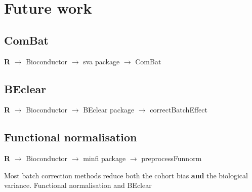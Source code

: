\documentclass[a4paper,10pt]{article}
\begin{document}
\section{Future work}
\subsection{ComBat}
%
\textbf{R} $\rightarrow$ Bioconductor $\rightarrow$ sva package $\rightarrow$ ComBat

\subsection{BEclear}

\textbf{R} $\rightarrow$ Bioconductor $\rightarrow$ BEclear package $\rightarrow$ correctBatchEffect

\subsection{Functional normalisation}

\textbf{R} $\rightarrow$ Bioconductor $\rightarrow$ minfi package $\rightarrow$ preprocessFunnorm

Most batch correction methods reduce both the cohort bias \textbf{and} the biological variance.
Functional normalisation and BEclear 



\end{document}
